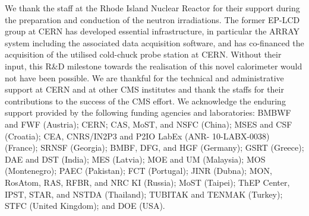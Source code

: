 \acknowledgments
We thank the staff at the Rhode Island Nuclear Reactor for their support during the preparation and conduction of the neutron irradiations.
The former EP-LCD group at CERN has developed essential infrastructure, in particular the ARRAY system including the associated data acquisition software, and has co-financed the acquisition of the utilised cold-chuck probe station at CERN.
Without their input, this R$\&$D milestone towards the realisation of this novel calorimeter would not have been possible. 
We are thankful for the technical and administrative support at CERN and at other CMS institutes and thank the staffs for their contributions to the success of the CMS effort. 
We acknowledge the enduring support provided by the following funding agencies and laboratories: BMBWF and FWF (Austria); CERN; CAS, MoST, and NSFC (China); MSES and CSF (Croatia); CEA, CNRS/IN2P3 and P2IO LabEx (ANR- 10-LABX-0038) (France); SRNSF (Georgia); BMBF, DFG, and HGF (Germany); GSRT (Greece); DAE and DST (India); MES (Latvia); MOE and UM (Malaysia); MOS (Montenegro); PAEC (Pakistan); FCT (Portugal); JINR (Dubna); MON, RosAtom, RAS, RFBR, and NRC KI (Russia); MoST (Taipei); ThEP Center, IPST, STAR, and NSTDA (Thailand); TUBITAK and TENMAK (Turkey); STFC (United Kingdom); and DOE (USA).
